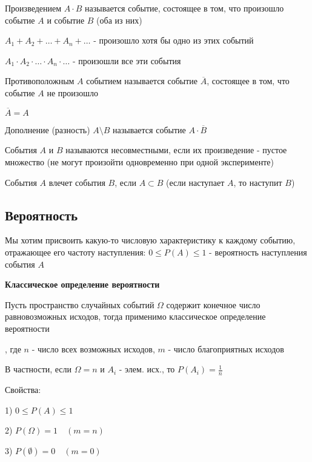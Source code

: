 \documentclass[12pt]{article}
\begin{document}
     Произведением $A \cdot B$ называется событие, состоящее в том, что произошло событие $A$ и событие $B$ (оба из них)

    \Notas $A_1 + A_2 + \dots + A_n + \dots$ - произошло хотя бы одно из этих событий

    $A_1 \cdot A_2 \cdot \dots \cdot A_n \cdot \dots$ - произошли все эти события

     Противоположным $A$ событием называется событие $\overline{A}$, состоящее в том, что событие $A$ не произошло

    \Notas $\overline{A} = A$ %

     Дополнение (разность) $A \setminus B$ называется событие $A \cdot \overline{B}$

     События $A$ и $B$ называются несовместными, если их произведение - пустое множество
    (не могут произойти одновременно при одной эксперименте)

     События $A$ влечет события $B$, если $A \subset B$ (если наступает $A$, то наступит $B$)

    \subsection{Вероятность}

    Мы хотим присвоить какую-то числовую характеристику к каждому событию,
    отражающее его частоту наступления: $0 \leq P(A) \leq 1$ - вероятность наступления события $A$

    \mediumvspace

    \hypertarget{classicdefinitionofprobability}{}

    \textbf{Классическое определение вероятности}

    Пусть пространство случайных событий $\Omega$ содержит конечное число равновозможных исходов,
    тогда применимо классическое определение вероятности

    \Def {}, где $n$ - число всех возможных исходов, $m$ - число благоприятных исходов

    В частности, если $\Omega = n$ и $A_i$ - элем. исх., то $P(A_i) = \frac{1}{n}$

    Свойства:

    1) $0 \leq P(A) \leq 1$

    2) $P(\Omega) = 1 \quad (m = n)$

    3) $P(\emptyset) = 0 \quad (m = 0)$
\end{document}

